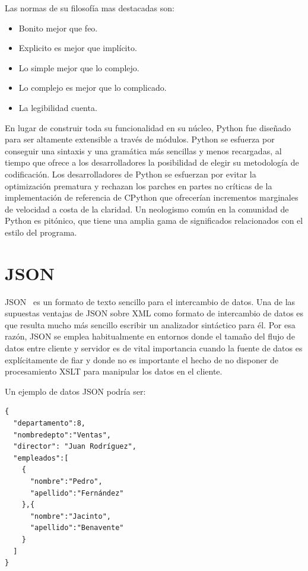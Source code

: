\documentclass[a4paper, 12pt]{book}
\begin{document}
Las normas de su filosofía mas destacadas son:

\begin{itemize}
	\item Bonito mejor que feo.
	\item Explicito es mejor que implícito.
	\item Lo simple mejor que lo complejo.
	\item Lo complejo es mejor que lo complicado.
	\item La legibilidad cuenta.
\end{itemize}

En lugar de construir toda su funcionalidad en su núcleo, Python fue diseñado para ser altamente extensible a través de módulos. Python se esfuerza por conseguir una sintaxis y una gramática más sencillas y menos recargadas, al tiempo que ofrece a los desarrolladores la posibilidad de elegir su metodología de codificación. Los desarrolladores de Python se esfuerzan por evitar la optimización prematura y rechazan los parches en partes no críticas de la implementación de referencia de CPython que ofrecerían incrementos marginales de velocidad a costa de la claridad.
Un neologismo común en la comunidad de Python es pitónico, que tiene una amplia gama de significados relacionados con el estilo del programa.


\section{JSON}
\label{sec:JSON}

JSON~\cite{website:JSON} es un formato de texto sencillo para el intercambio de datos. Una de las supuestas ventajas de JSON sobre XML como formato de intercambio de datos es que resulta mucho más sencillo escribir un analizador sintáctico para él. Por esa razón, JSON se emplea habitualmente en entornos donde el tamaño del flujo de datos entre cliente y servidor es de vital importancia cuando la fuente de datos es explícitamente de fiar y donde no es importante el hecho de no disponer de procesamiento XSLT para manipular los datos en el cliente.

Un ejemplo de datos JSON podría ser:
{\footnotesize
\begin{verbatim}
{
  "departamento":8,
  "nombredepto":"Ventas",
  "director": "Juan Rodríguez",
  "empleados":[
    {
      "nombre":"Pedro",
      "apellido":"Fernández"
    },{
      "nombre":"Jacinto",
      "apellido":"Benavente"
    } 
  ]
}
\end{verbatim}
}
\end{document}
